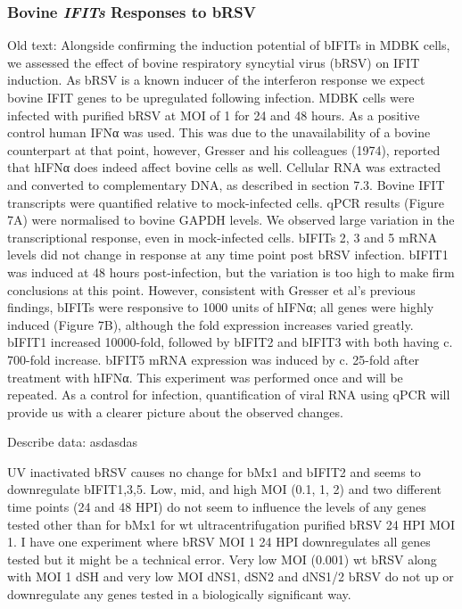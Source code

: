 \subsubsection{Bovine \textit{IFITs} Responses to bRSV} \label{Bovine \textit{IFITs} Responses to bRSV}
Old text:
Alongside confirming the induction potential of bIFITs in MDBK cells, we assessed the effect of bovine respiratory syncytial virus (bRSV) on IFIT induction. As bRSV is a known inducer of the interferon response we expect bovine IFIT genes to be upregulated following infection. MDBK cells were infected with purified bRSV at MOI of 1 for 24 and 48 hours. As a positive control human IFNα was used. This was due to the unavailability of a bovine counterpart at that point, however, Gresser and his colleagues (1974), reported that hIFNα does indeed affect bovine cells as well. Cellular RNA was extracted and converted to complementary DNA, as described in section 7.3. Bovine IFIT transcripts were quantified relative to mock-infected cells. qPCR results (Figure 7A) were normalised to bovine GAPDH levels. We observed large variation in the transcriptional response, even in mock-infected cells. bIFITs 2, 3 and 5 mRNA levels did not change in response at any time point post bRSV infection. bIFIT1 was induced at 48 hours post-infection, but the variation is too high to make firm conclusions at this point. However, consistent with Gresser et al’s previous findings, bIFITs were responsive to 1000 units of hIFNα; all genes were highly induced (Figure 7B), although the fold expression increases varied greatly. bIFIT1 increased 10000-fold, followed by bIFIT2 and bIFIT3 with both having c. 700-fold increase. bIFIT5 mRNA expression was induced by c. 25-fold after treatment with hIFNα. This experiment was performed once and will be repeated. As a control for infection, quantification of viral RNA using qPCR will provide us with a clearer picture about the observed changes.

Describe data: \newline
asdasdas

UV inactivated bRSV causes no change for bMx1 and bIFIT2 and seems to downregulate bIFIT1,3,5. Low, mid, and high MOI (0.1, 1, 2) and two different time points (24 and 48 HPI) do not seem to influence the levels of any genes tested other than for bMx1 for wt ultracentrifugation purified bRSV 24 HPI MOI 1. I have one experiment where bRSV MOI 1 24 HPI downregulates all genes tested but it might be a technical error. 
Very low MOI (0.001) wt bRSV along with MOI 1 dSH and very low MOI dNS1, dSN2 and dNS1/2 bRSV do not up or downregulate any genes tested in a biologically significant way.

